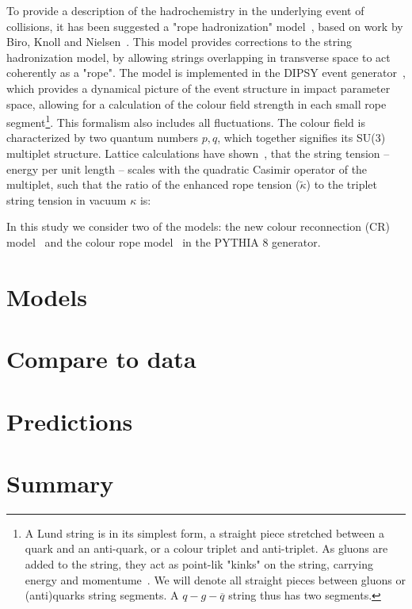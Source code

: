 \documentclass[ALICE,manyauthors]{StrinJet}
\begin{document}
To provide a description of the hadrochemistry in the underlying event of \pp collisions, it has been suggested a "rope hadronization" model~\cite{Bierlich:2014xba}, based on work by Biro, Knoll and Nielsen~\cite{Biro:1984cf}. This model provides corrections to the string hadronization model, by allowing strings overlapping in transverse space to act coherently as a "rope". The model is implemented in the DIPSY event generator~\cite{Flensburg:2011kk}, which provides a dynamical picture of the event structure in impact parameter space, allowing for a calculation of the colour field strength in each small rope segment\footnote{A Lund string is in its simplest form, a straight piece stretched between a quark and an anti-quark, or a colour triplet and anti-triplet. As gluons are added to the string, they act as point-lik "kinks" on the string, carrying energy and momentume~\cite{Andersson:1979ij}. We will denote all straight pieces between gluons or (anti)quarks string segments. A $q - g - \overline{q}$ string thus has two segments.}. This formalism also includes all fluctuations. The colour field is characterized by two quantum numbers ${p, q}$, which together signifies its SU(3) multiplet structure. Lattice calculations have shown~\cite{Bali:2000un}, that the string tension -- energy per unit length -- scales with the quadratic Casimir operator of the multiplet, such that the ratio of the enhanced rope tension ($\widetilde{\kappa}$) to the triplet string tension in vacuum $\kappa$ is:


In this study we consider two of the models: the new colour reconnection (CR) model~\cite{Christiansen:2015yqa} and the colour rope model~\cite{Biro:1984cf} in the PYTHIA 8 generator.
\section{Models}
\label{sec:model}

\section{Compare to data}
\label{sec:com2da}


\section{Predictions}
\label{sec:predic}

\section{Summary}
\label{sec:sum}
\end{document}
